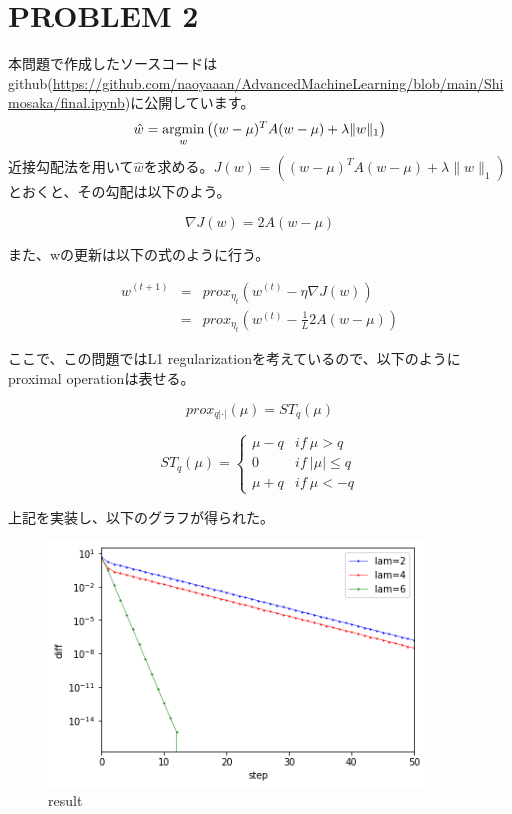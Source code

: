 \documentclass[a4j,11pt]{jarticle}
\newcommand{\argmin}{\mathop{\rm argmin}\limits}
\begin{document}
\newpage
\section{PROBLEM 2}
本問題で作成したソースコードはgithub(\url{https://github.com/naoyaaan/AdvancedMachineLearning/blob/main/Shimosaka/final.ipynb})に公開しています。
\begin{equation}
    \hat{w} = \argmin_{w} \left((w-\mu)^{T}A(w-\mu)+\lambda \|w\|_1\right)
\end{equation}
近接勾配法を用いて$\hat{w}$を求める。$J(w) = \left((w-\mu)^{T}A(w-\mu)+\lambda \|w\|_1\right)$とおくと、その勾配は以下のよう。

\begin{equation}
    \nabla J(w) = 2A(w-\mu)
\end{equation}

また、wの更新は以下の式のように行う。

\begin{eqnarray}
    w^{(t+1)} &=& prox_{\eta_t} \left(w^{(t)} - \eta\nabla J(w)\right)\\
    &=& prox_{\eta_t} \left(w^{(t)} - \frac{1}{L}2A(w-\mu)\right)
\end{eqnarray}

ここで、この問題ではL1 regularizationを考えているので、以下のようにproximal operationは表せる。

\begin{equation}
    prox_{q|\cdot|}(\mu) = ST_q(\mu)
\end{equation}

\begin{equation}
    ST_q(\mu) = \begin{cases}
        \mu-q & if~\mu > q \\
        0 & if~|\mu| \leq q \\
        \mu+q & if~\mu < -q
    \end{cases}
\end{equation}

上記を実装し、以下のグラフが得られた。
\begin{figure}[htbp]
    \centering
    \includegraphics[width=100mm]{p2-4.png}
    \caption{result}
\end{figure}
\end{document}

